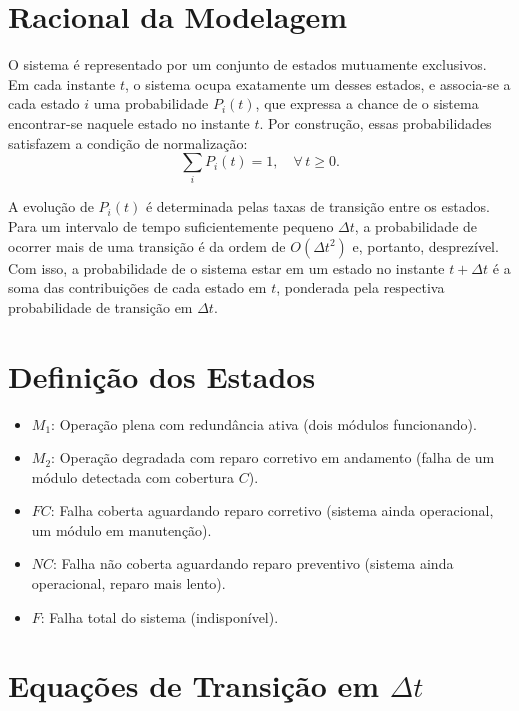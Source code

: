 \documentclass[12pt]{article}
\begin{document}
\section*{Racional da Modelagem}

O sistema é representado por um conjunto de estados mutuamente exclusivos.
Em cada instante $t$, o sistema ocupa exatamente um desses estados, e
associa-se a cada estado $i$ uma probabilidade $P_i(t)$, que expressa a
chance de o sistema encontrar-se naquele estado no instante $t$. Por
construção, essas probabilidades satisfazem a condição de normalização:
\[
    \sum_{i} P_i(t) = 1, \quad \forall\, t \geq 0.
\]

A evolução de $P_i(t)$ é determinada pelas taxas de transição entre os
estados. Para um intervalo de tempo suficientemente pequeno $\Delta t$, a
probabilidade de ocorrer mais de uma transição é da ordem de
$O(\Delta t^2)$ e, portanto, desprezível. Com isso, a probabilidade de o
sistema estar em um estado no instante $t + \Delta t$ é a soma das
contribuições de cada estado em $t$, ponderada pela respectiva
probabilidade de transição em $\Delta t$.

\newpage
\section{Definição dos Estados}

\begin{itemize}
    \item \textbf{$M_1$}: Operação plena com redundância ativa (dois módulos funcionando).
    \item \textbf{$M_2$}: Operação degradada com reparo corretivo em andamento (falha de um módulo detectada com cobertura $C$).
    \item \textbf{$FC$}: Falha coberta aguardando reparo corretivo (sistema ainda operacional, um módulo em manutenção).
    \item \textbf{$NC$}: Falha não coberta aguardando reparo preventivo (sistema ainda operacional, reparo mais lento).
    \item \textbf{$F$}: Falha total do sistema (indisponível).
\end{itemize}

\newpage
\section{Equações de Transição em $\Delta t$}
\end{document}
